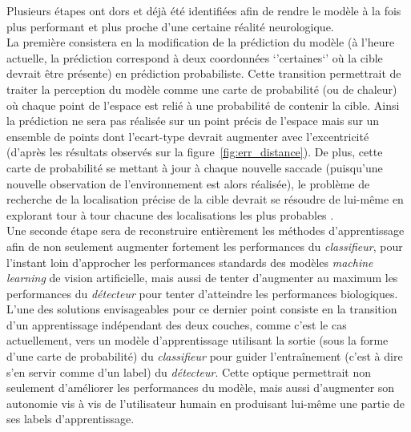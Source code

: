 	
Plusieurs étapes ont dors et déjà été identifiées afin de rendre le modèle à la fois plus performant et plus proche d'une certaine réalité neurologique. \\
La première consistera en la modification de la prédiction du modèle (à l'heure actuelle, la prédiction correspond à deux coordonnées `'certaines`' où la cible devrait être présente) en prédiction probabiliste. 
Cette transition permettrait de traiter la perception du modèle comme une carte de probabilité (ou de chaleur) où chaque point de l'espace est relié à une probabilité de contenir la cible. Ainsi la prédiction ne sera pas réalisée sur un point précis de l'espace mais sur un ensemble de points dont l'ecart-type devrait augmenter avec l'excentricité (d'après les résultats observés sur la figure~\ref{fig:err_distance}). De plus, cette carte de probabilité se mettant à jour à chaque nouvelle saccade (puisqu'une nouvelle observation de l'environnement est alors réalisée), le problème de recherche de la localisation précise de la cible devrait se résoudre de lui-même en explorant tour à tour chacune des localisations les plus probables \autocite{Butko2010, Najemnik2005}.\\

Une seconde étape sera de reconstruire entièrement les méthodes d'apprentissage afin de non seulement augmenter fortement les performances du \textit{classifieur}, pour l'instant loin d'approcher les performances standards des modèles \textit{machine learning} de vision artificielle, mais aussi de tenter d'augmenter au maximum les performances du \textit{détecteur} pour tenter d'atteindre les performances biologiques. \\
L'une des solutions envisageables pour ce dernier point consiste en la transition d'un apprentissage indépendant des deux couches, comme c'est le cas actuellement, vers un modèle d'apprentissage utilisant la sortie (sous la forme d'une carte de probabilité) du \textit{classifieur} pour guider l'entraînement (c'est à dire s'en servir comme d'un label) du \textit{détecteur}. Cette optique permettrait non seulement d'améliorer les performances du modèle, mais aussi d'augmenter son autonomie vis à vis de l'utilisateur humain en produisant lui-même une partie de ses labels d'apprentissage. \\

